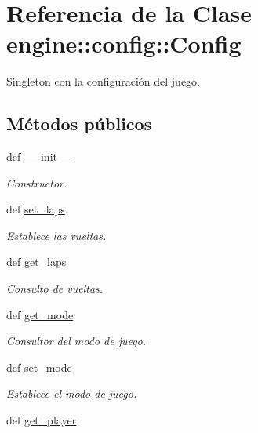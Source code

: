\hypertarget{classengine_1_1config_1_1Config}{
\section{\-Referencia de la \-Clase engine\-:\-:config\-:\-:\-Config}
\label{classengine_1_1config_1_1Config}
}


\-Singleton con la configuración del juego.  


\subsection*{\-Métodos públicos}
\begin{DoxyCompactItemize}
\item 
def \hyperlink{classengine_1_1config_1_1Config_acc5ef9757e69d126aa51555b9b132839}{\-\_\-\-\_\-init\-\_\-\-\_\-}
\begin{DoxyCompactList}\small\item\em \-Constructor. \end{DoxyCompactList}\item 
def \hyperlink{classengine_1_1config_1_1Config_a43caf1efd53bc99207f1a1337f46aed9}{set\-\_\-laps}
\begin{DoxyCompactList}\small\item\em \-Establece las vueltas. \end{DoxyCompactList}\item 
def \hyperlink{classengine_1_1config_1_1Config_ad8b08438040726f81f1540ba7534b300}{get\-\_\-laps}
\begin{DoxyCompactList}\small\item\em \-Consulto de vueltas. \end{DoxyCompactList}\item 
def \hyperlink{classengine_1_1config_1_1Config_ae5f03490945219f494d12648130c9bbe}{get\-\_\-mode}
\begin{DoxyCompactList}\small\item\em \-Consultor del modo de juego. \end{DoxyCompactList}\item 
def \hyperlink{classengine_1_1config_1_1Config_a2dc424e93df76e579f1829aaf8912499}{set\-\_\-mode}
\begin{DoxyCompactList}\small\item\em \-Establece el modo de juego. \end{DoxyCompactList}\item 
def \hyperlink{classengine_1_1config_1_1Config_a967733c91d503c52dd8d3ded7f5f23fe}{get\-\_\-player}

\end{DoxyCompactItemize}
